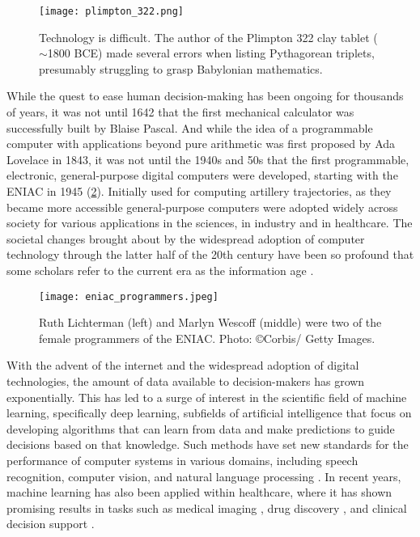 \begin{figure}[t]
    \centering
    \texttt{[image: plimpton\_322.png]}
    \caption{Technology is difficult. The author of the Plimpton 322 clay tablet ($\sim$1800 BCE) made several errors when listing Pythagorean triplets, presumably struggling to grasp Babylonian mathematics.}
    \label{fig:plimpton_332}
\end{figure}

While the quest to ease human decision-making has been ongoing for thousands of years, it was not until 1642 that the first mechanical calculator was successfully built by Blaise Pascal. And while the idea of a programmable computer with applications beyond pure arithmetic was first proposed by Ada Lovelace in 1843, 
it was not until the 1940s and 50s that %
the first programmable, electronic, general-purpose digital computers were developed, starting with the ENIAC in 1945 \cite{georges_universal_2001} (\cref{fig:eniac_programmers}). 
Initially used for computing artillery trajectories, as they became more accessible general-purpose computers were adopted widely across society for various applications in the sciences, in industry and in healthcare.
The societal changes brought about by the widespread adoption of computer technology through the latter half of the 20th century have been so profound that some scholars refer to the current era as the information age \cite{georges_universal_2001, harari_sapiens_2011}.

\begin{figure}[t]
    \centering
    \texttt{[image: eniac\_programmers.jpeg]}
    \caption{Ruth Lichterman (left) and Marlyn Wescoff (middle) were two of the female programmers of the ENIAC. Photo: \copyright Corbis/ Getty Images.}
    \label{fig:eniac_programmers}
\end{figure}

With the advent of the internet and the widespread adoption of digital technologies, the amount of data available to decision-makers has grown exponentially. 
This has led to a surge of interest in the scientific field of machine learning, specifically deep learning, subfields of artificial intelligence that focus on developing algorithms that can learn from data and make predictions to guide decisions based on that knowledge. 
Such methods have set new standards for the performance of computer systems in various domains, including speech recognition, computer vision, and natural language processing \cite{lecun_deep_2015}.
In recent years, machine learning has also been applied within healthcare, where it has shown promising results in tasks such as medical imaging \cite{lundervold_overview_2019}, drug discovery \cite{chen_rise_2018}, and clinical decision support \cite{cite15, cite14}.

